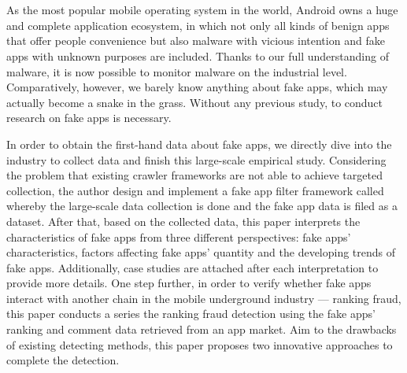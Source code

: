 \newpage
\cleardoublepage{}

\chapter*{}
\vspace{-5mm}

As the most popular mobile operating system in the world, Android owns a huge and complete application ecosystem, in which not only all kinds of benign apps that offer people convenience but also malware with vicious intention and fake apps with unknown purposes are included.
Thanks to our full understanding of malware, it is now possible to monitor malware on the industrial level.
Comparatively, however, we barely know anything about fake apps, which may actually become a snake in the grass.
Without any previous study, to conduct research on fake apps is necessary.

In order to obtain the first-hand data about fake apps, we directly dive into the industry to collect data and finish this large-scale empirical study.
Considering the problem that existing crawler frameworks are not able to achieve targeted collection, the author design and implement a fake app filter framework called \mytool whereby the large-scale data collection is done and the fake app data is filed as a dataset.
After that, based on the collected data, this paper interprets the characteristics of fake apps from three different perspectives: fake apps' characteristics, factors affecting fake apps' quantity and the developing trends of fake apps.
Additionally, case studies are attached after each interpretation to provide more details.
One step further, in order to verify whether fake apps interact with another chain in the mobile underground industry --- ranking fraud, this paper conducts a series the ranking fraud detection using the fake apps' ranking and comment data retrieved from an app market.
Aim to the drawbacks of existing detecting methods, this paper proposes two innovative approaches to complete the detection.

